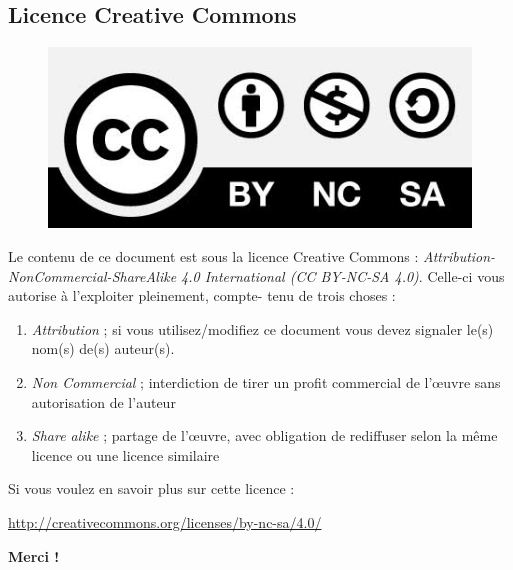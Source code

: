 \subsection*{Licence Creative Commons}
\begin{figure}
	\includegraphics[scale=0.17]{CC}
\end{figure}
Le contenu de ce document est sous la licence Creative Commons : \textit{Attribution-NonCommercial-ShareAlike 
4.0 International (CC BY-NC-SA 4.0)}. Celle-ci vous autorise à l'exploiter pleinement, compte-
tenu de trois choses :
\begin{enumerate}
	\item \textit{Attribution} ; si vous utilisez/modifiez ce document vous devez signaler le(s) nom(s)
	      de(s) auteur(s).
	\item \textit{Non Commercial} ; interdiction de tirer un profit commercial de l’œuvre sans 
	      autorisation de l'auteur 
	\item \textit{Share alike} ;  partage de l’œuvre, avec obligation de rediffuser selon la même 
	      licence ou une licence similaire
\end{enumerate}
Si vous voulez en savoir plus sur cette licence :
\begin{center}
	\url{http://creativecommons.org/licenses/by-nc-sa/4.0/}
\end{center}

\begin{flushright}
	\textbf{Merci ! }
\end{flushright}